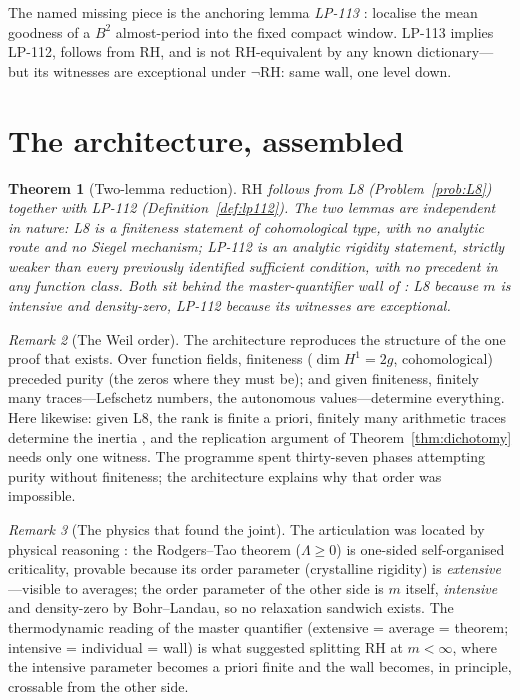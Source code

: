 \documentclass[11pt]{amsart}
\newtheorem{theorem}{Theorem}[section]
\theoremstyle{definition}
\theoremstyle{remark}
\newtheorem{remark}[theorem]{Remark}
\newcommand{\RH}{\mathrm{RH}}
\begin{document}
The named missing piece is the anchoring lemma \emph{LP-113}
\cite[]{P40}: localise the mean goodness of a $B^2$ almost-period
into the fixed compact window. LP-113 implies LP-112, follows from RH, and
is not RH-equivalent by any known dictionary---but its witnesses are
exceptional under $\neg\RH$: same wall, one level down.

\section{The architecture, assembled}\label{sec:architecture}

\begin{theorem}[Two-lemma reduction]\label{thm:architecture}
$\RH$ follows from L8 (Problem~\ref{prob:L8}) together with LP-112
(Definition~\ref{def:lp112}). The two lemmas are independent in nature:
L8 is a finiteness statement of cohomological type, with no analytic route
and no Siegel mechanism; LP-112 is an analytic rigidity statement, strictly
weaker than every previously identified sufficient condition, with no
precedent in any function class. Both sit behind the master-quantifier
wall of \cite{P43}: L8 because $m$ is intensive and density-zero, LP-112
because its witnesses are exceptional.
\end{theorem}

\begin{remark}[The Weil order]
The architecture reproduces the structure of the one proof that exists.
Over function fields, finiteness ($\dim H^1=2g$, cohomological) preceded
purity (the zeros where they must be); and given finiteness, finitely many
traces---Lefschetz numbers, the autonomous values---determine everything.
Here likewise: given L8, the rank is finite a priori, finitely many
arithmetic traces determine the inertia \cite[Prop.~4.5]{P40},
and the replication argument of Theorem~\ref{thm:dichotomy} needs only one
witness. The programme spent thirty-seven phases attempting purity without
finiteness; the architecture explains why that order was impossible.
\end{remark}

\begin{remark}[The physics that found the joint]
The articulation was located by physical reasoning \cite[]{P40}:
the Rodgers--Tao theorem ($\Lambda\geq0$) is one-sided self-organised
criticality, provable because its order parameter (crystalline rigidity)
is \emph{extensive}---visible to averages; the order parameter of the other
side is $m$ itself, \emph{intensive} and density-zero by Bohr--Landau, so
no relaxation sandwich exists. The thermodynamic reading of the master
quantifier (extensive = average = theorem; intensive = individual = wall)
is what suggested splitting RH at $m<\infty$, where the intensive parameter
becomes a priori finite and the wall becomes, in principle, crossable from
the other side.
\end{remark}
\end{document}
